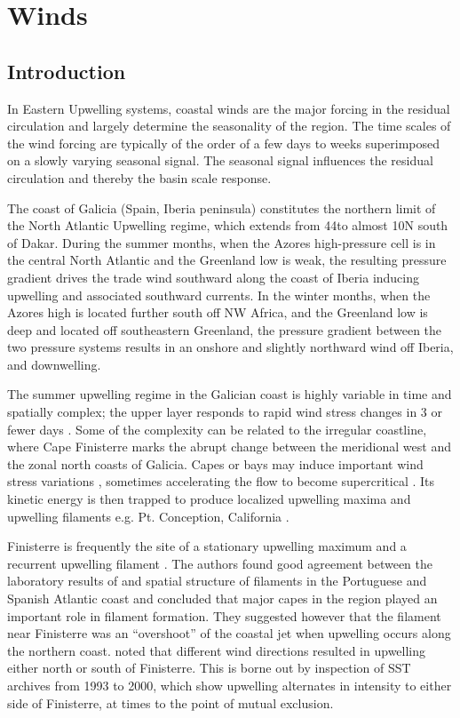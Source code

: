 \chapter{Winds}\label{ch:winds}
\section{Introduction}
In Eastern Upwelling systems, coastal winds are the major forcing
in the residual circulation and largely determine the seasonality
of the region. The time scales of the wind forcing are typically
of the order of a few days to weeks superimposed on a slowly
varying seasonal signal. The seasonal signal influences the
residual circulation and thereby the basin scale response.

The coast of Galicia (Spain, Iberia peninsula) constitutes the
northern limit of the North Atlantic Upwelling regime, which
extends from 44\deg to almost 10\deg N south of Dakar. During the
summer months, when the Azores high-pressure cell is in the
central North Atlantic and the Greenland low is weak, the
resulting pressure gradient drives the trade wind southward along
the coast of Iberia inducing upwelling and associated southward
currents. In the winter months, when the Azores high is located
further south off NW Africa, and the Greenland low is deep and
located off southeastern Greenland, the pressure gradient between
the two pressure systems results in an onshore and slightly
northward wind off Iberia, and downwelling.

The summer upwelling regime in the Galician coast is highly
variable in time and spatially complex; the upper layer responds
to rapid wind stress changes in 3 or fewer days
\citep{Mcclain86,huthnance02}. Some of the complexity can be
related to the irregular coastline, where Cape Finisterre marks
the abrupt change between the meridional west and the zonal north
coasts of Galicia. Capes or bays may induce important wind stress
variations \citep{Enriquez95}, sometimes accelerating the flow to
become supercritical \citep{Winant88}. Its kinetic energy is then
trapped to produce localized upwelling maxima and upwelling
filaments e.g. Pt. Conception, California \citep{barth87}.

Finisterre is frequently the site of a stationary upwelling
maximum \citep{Blanton84,Castro94} and a recurrent upwelling
filament \citep{Haynes93}. The authors found good agreement
between the laboratory results of \citet{Narimousa89} and spatial
structure of filaments in the Portuguese and Spanish Atlantic
coast and concluded that major capes in the region played an
important role in filament formation. They suggested however that
the filament near Finisterre was an ``overshoot'' of the coastal
jet when upwelling occurs along the northern coast.
\citet{Mcclain86} noted that different wind directions resulted in
upwelling either north or south of Finisterre. This is borne out
by inspection of SST archives from 1993 to 2000, which show
upwelling alternates in intensity to either side of Finisterre, at
times to the point of mutual exclusion.


